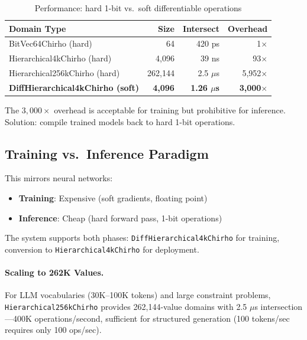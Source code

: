 \documentclass[11pt,a4paper]{article}
\begin{document}
\begin{table}[ht]
\centering
\caption{Performance: hard 1-bit vs.\ soft differentiable operations}
\label{tab:soft_hard_chirho}
\begin{tabular}{lrrr}
\toprule
\textbf{Domain Type} & \textbf{Size} & \textbf{Intersect} & \textbf{Overhead} \\
\midrule
BitVec64Chirho (hard) & 64 & 420 ps & 1$\times$ \\
Hierarchical4kChirho (hard) & 4,096 & 39 ns & 93$\times$ \\
Hierarchical256kChirho (hard) & 262,144 & 2.5 $\mu$s & 5,952$\times$ \\
\textbf{DiffHierarchical4kChirho (soft)} & \textbf{4,096} & \textbf{1.26 $\mu$s} & \textbf{3,000$\times$} \\
\bottomrule
\end{tabular}
\end{table}

The $3{,}000\times$ overhead is acceptable for training but prohibitive for inference.
Solution: compile trained models back to hard 1-bit operations.

\subsection{Training vs.\ Inference Paradigm}
\label{subsec:train_infer_chirho}

This mirrors neural networks:
\begin{itemize}
  \item \textbf{Training}: Expensive (soft gradients, floating point)
  \item \textbf{Inference}: Cheap (hard forward pass, 1-bit operations)
\end{itemize}

The system supports both phases: \texttt{DiffHierarchical4kChirho} for training, conversion to \texttt{Hierarchical4kChirho} for deployment.

\paragraph{Scaling to 262K Values.}
For LLM vocabularies (30K--100K tokens) and large constraint problems, \texttt{Hierarchical256kChirho} provides 262,144-value domains with 2.5 $\mu$s intersection---400K operations/second, sufficient for structured generation (100 tokens/sec requires only 100 ops/sec).

\end{document}
